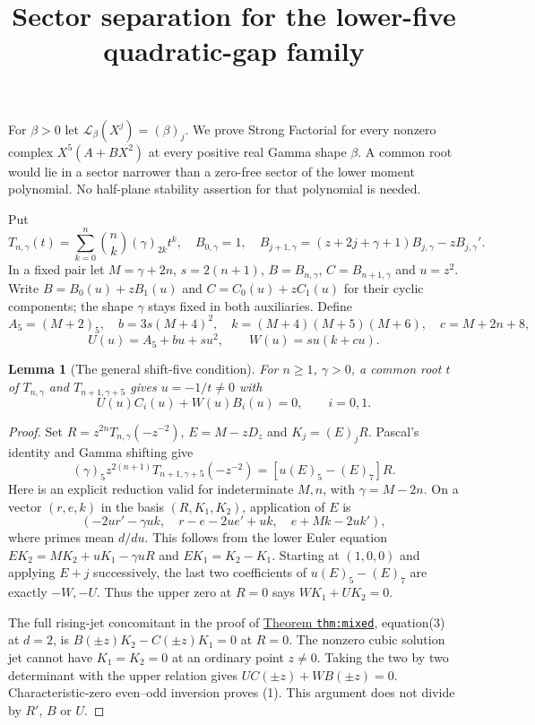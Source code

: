 \documentclass[11pt]{article}
\newtheorem{lemma}{Lemma}
\begin{document}
\setlength{\emergencystretch}{1em}
\title{Sector separation for the lower-five quadratic-gap family}
\author{}\date{}\maketitle
For $\beta>0$ let $\mathcal L_\beta(X^j)=(\beta)_j$.
We prove Strong Factorial for every nonzero complex
$X^5(A+BX^2)$ at every positive real Gamma shape $\beta$.
A common root would lie in a sector narrower than a zero-free
sector of the lower moment polynomial.
No half-plane stability assertion for that polynomial is needed.

Put
\[
 T_{n,\gamma}(t)=\sum_{k=0}^n\binom nk(\gamma)_{2k}t^k,\quad
 B_{0,\gamma}=1,\quad
 B_{j+1,\gamma}=(z+2j+\gamma+1)B_{j,\gamma}-zB_{j,\gamma}'.
\]
In a fixed pair let $M=\gamma+2n$, $s=2(n+1)$,
$B=B_{n,\gamma}$, $C=B_{n+1,\gamma}$ and $u=z^2$.
Write $B=B_0(u)+zB_1(u)$ and $C=C_0(u)+zC_1(u)$ for their
cyclic components; the shape $\gamma$ stays fixed in both auxiliaries.
Define
\[
 A_5=(M+2)_5,\quad b=3s(M+4)^2,\quad
 k=(M+4)(M+5)(M+6),\quad c=M+2n+8,
\]
\[
 U(u)=A_5+bu+su^2,\qquad W(u)=su(k+cu).
\]

\begin{lemma}[The general shift-five condition]\label{lem:shift-general}
For $n\ge1$, $\gamma>0$, a common root $t$ of
$T_{n,\gamma}$ and $T_{n+1,\gamma+5}$ gives $u=-1/t\ne0$ with
\[
 U(u)C_i(u)+W(u)B_i(u)=0,\qquad i=0,1.                 \tag{1}
\]
\end{lemma}
\begin{proof}
Set $R=z^{2n}T_{n,\gamma}(-z^{-2})$, $E=M-zD_z$ and
$K_j=(E)_jR$.
Pascal's identity and Gamma shifting give
\[
 (\gamma)_5z^{2(n+1)}T_{n+1,\gamma+5}(-z^{-2})
                    =[u(E)_5-(E)_7]R.
\]
Here is an explicit reduction valid for indeterminate $M,n$,
with $\gamma=M-2n$.
On a vector $(r,e,k)$ in the basis $(R,K_1,K_2)$,
application of $E$ is
\[
 (-2ur'-\gamma uk,\quad
   r-e-2ue'+uk,\quad e+Mk-2uk'),                       \tag{2}
\]
where primes mean $d/du$.
This follows from the lower Euler equation
$EK_2=MK_2+uK_1-\gamma uR$ and $EK_1=K_2-K_1$.
Starting at $(1,0,0)$ and applying $E+j$ successively,
the last two coefficients of $u(E)_5-(E)_7$ are exactly
$-W,-U$. Thus the upper zero at $R=0$ says
$WK_1+UK_2=0$.

The full rising-jet concomitant in the proof of
\href{LOWER_TWO_PRIME_GAP_SFC.tex}{Theorem \texttt{thm:mixed}},
equation(3) at $d=2$, is
$B(\pm z)K_2-C(\pm z)K_1=0$ at $R=0$.
The nonzero cubic solution jet cannot have $K_1=K_2=0$
at an ordinary point $z\ne0$.
Taking the two by two determinant with the upper relation gives
$UC(\pm z)+WB(\pm z)=0$.
Characteristic-zero even--odd inversion proves (1).
This argument does not divide by $R'$, $B$ or $U$.
\end{proof}
\end{document}
